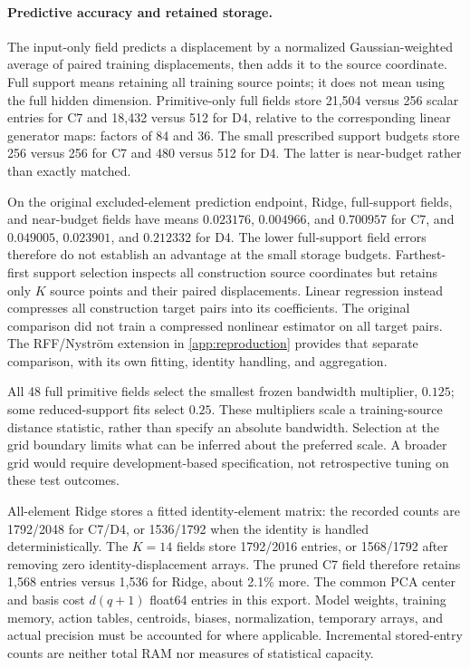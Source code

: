 \paragraph{Predictive accuracy and retained storage.}
The input-only field predicts a displacement by a normalized
Gaussian-weighted average of paired training displacements,
then adds it to the source coordinate.
Full support means retaining all training source points;
it does not mean using the full hidden dimension.
Primitive-only full fields store 21,504 versus 256 scalar
entries for C7 and 18,432 versus 512 for D4, relative to
the corresponding linear generator maps: factors of 84
and 36.
The small prescribed support budgets store 256 versus 256
for C7 and 480 versus 512 for D4.
The latter is near-budget rather than exactly matched.

On the original excluded-element prediction endpoint,
Ridge, full-support fields, and near-budget fields have
means $0.023176$, $0.004966$, and $0.700957$ for C7,
and $0.049005$, $0.023901$, and $0.212332$ for D4.
The lower full-support field errors therefore do not
establish an advantage at the small storage budgets.
Farthest-first support selection inspects all construction
source coordinates but retains only $K$ source points
and their paired displacements.
Linear regression instead compresses all construction
target pairs into its coefficients.
The original comparison did not train a compressed
nonlinear estimator on all target pairs.
The RFF/Nystr\"om extension in \cref{app:reproduction}
provides that separate comparison, with its own fitting,
identity handling, and aggregation.

All 48 full primitive fields select the smallest frozen
bandwidth multiplier, $0.125$; some reduced-support fits
select $0.25$.
These multipliers scale a training-source distance statistic,
rather than specify an absolute bandwidth.
Selection at the grid boundary limits what can be inferred
about the preferred scale.
A broader grid would require development-based specification,
not retrospective tuning on these test outcomes.

All-element Ridge stores a fitted identity-element matrix:
the recorded counts are 1792/2048 for C7/D4, or
1536/1792 when the identity is handled deterministically.
The $K=14$ fields store 1792/2016 entries, or 1568/1792
after removing zero identity-displacement arrays.
The pruned C7 field therefore retains 1,568 entries versus
1,536 for Ridge, about 2.1\% more.
The common PCA center and basis cost $d(q+1)$ float64
entries in this export.
Model weights, training memory, action tables, centroids,
biases, normalization, temporary arrays, and actual
precision must be accounted for where applicable.
Incremental stored-entry counts are neither total RAM
nor measures of statistical capacity.

